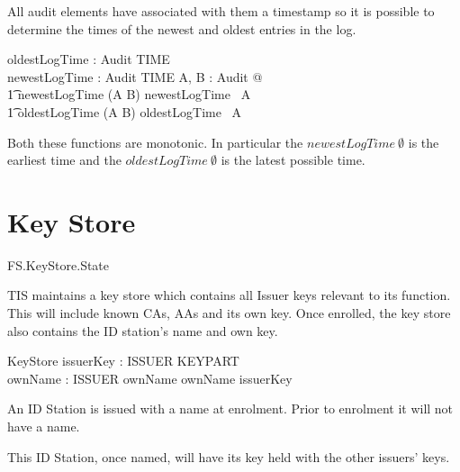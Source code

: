 All audit elements have associated with them a timestamp so it is
possible to determine the times of the newest and oldest entries in the
log.

\begin{axdef}
        oldestLogTime : \finset Audit \fun TIME 
\\      newestLogTime : \finset Audit \fun TIME
\where
        \forall A, B : \finset Audit @
\\  \t1 newestLogTime (A \cup B) \geq newestLogTime~ A
\\  \t1 \land oldestLogTime (A \cup B) \leq oldestLogTime~ A
\end{axdef}
\begin{Zcomment}
\item 
Both these functions are monotonic. In particular the $newestLogTime~
\emptyset$ is the earliest time and the 
$oldestLogTime~ \emptyset$ is the latest
possible time.
\end{Zcomment}

\section{Key Store}

\begin{traceunit}{FS.KeyStore.State}
\end{traceunit}


TIS maintains a key store which contains all Issuer keys relevant to
its function. This will include known CAs, AAs and its own key. 
Once enrolled, the key store also contains the ID station's name
and own key.

\begin{schema}{KeyStore}
        issuerKey : ISSUER \pfun KEYPART
\\      ownName : \Optional ISSUER
\where
        ownName \neq \Nil \implies \The ownName \in \dom issuerKey 
\end{schema}
\begin{Zcomment}
\item
An ID Station is issued with a name at enrolment. Prior to enrolment
it will not have a name.
\item
This ID Station, once named, will have its key held with the other 
issuers' keys.
\end{Zcomment}

